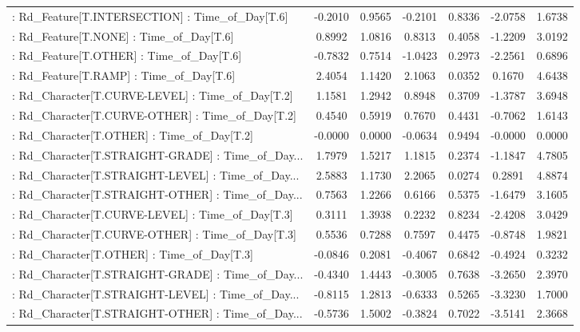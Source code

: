 \begin{longtable}{p{4cm}cccccc}
 : Rd\_Feature[T.INTERSECTION] : Time\_of\_Day[T.6]   & -0.2010 &    0.9565 & -0.2101 &       0.8336 & -2.0758 &  1.6738 \\
 : Rd\_Feature[T.NONE] : Time\_of\_Day[T.6]           &  0.8992 &    1.0816 &  0.8313 &       0.4058 & -1.2209 &  3.0192 \\
 : Rd\_Feature[T.OTHER] : Time\_of\_Day[T.6]          & -0.7832 &    0.7514 & -1.0423 &       0.2973 & -2.2561 &  0.6896 \\
 : Rd\_Feature[T.RAMP] : Time\_of\_Day[T.6]           &  2.4054 &    1.1420 &  2.1063 &       0.0352 &  0.1670 &  4.6438 \\
 : Rd\_Character[T.CURVE-LEVEL] : Time\_of\_Day[T.2]  &  1.1581 &    1.2942 &  0.8948 &       0.3709 & -1.3787 &  3.6948 \\
 : Rd\_Character[T.CURVE-OTHER] : Time\_of\_Day[T.2]  &  0.4540 &    0.5919 &  0.7670 &       0.4431 & -0.7062 &  1.6143 \\
 : Rd\_Character[T.OTHER] : Time\_of\_Day[T.2]        & -0.0000 &    0.0000 & -0.0634 &       0.9494 & -0.0000 &  0.0000 \\
 : Rd\_Character[T.STRAIGHT-GRADE] : Time\_of\_Day... &  1.7979 &    1.5217 &  1.1815 &       0.2374 & -1.1847 &  4.7805 \\
 : Rd\_Character[T.STRAIGHT-LEVEL] : Time\_of\_Day... &  2.5883 &    1.1730 &  2.2065 &       0.0274 &  0.2891 &  4.8874 \\
 : Rd\_Character[T.STRAIGHT-OTHER] : Time\_of\_Day... &  0.7563 &    1.2266 &  0.6166 &       0.5375 & -1.6479 &  3.1605 \\
 : Rd\_Character[T.CURVE-LEVEL] : Time\_of\_Day[T.3]  &  0.3111 &    1.3938 &  0.2232 &       0.8234 & -2.4208 &  3.0429 \\
 : Rd\_Character[T.CURVE-OTHER] : Time\_of\_Day[T.3]  &  0.5536 &    0.7288 &  0.7597 &       0.4475 & -0.8748 &  1.9821 \\
 : Rd\_Character[T.OTHER] : Time\_of\_Day[T.3]        & -0.0846 &    0.2081 & -0.4067 &       0.6842 & -0.4924 &  0.3232 \\
 : Rd\_Character[T.STRAIGHT-GRADE] : Time\_of\_Day... & -0.4340 &    1.4443 & -0.3005 &       0.7638 & -3.2650 &  2.3970 \\
 : Rd\_Character[T.STRAIGHT-LEVEL] : Time\_of\_Day... & -0.8115 &    1.2813 & -0.6333 &       0.5265 & -3.3230 &  1.7000 \\
 : Rd\_Character[T.STRAIGHT-OTHER] : Time\_of\_Day... & -0.5736 &    1.5002 & -0.3824 &       0.7022 & -3.5141 &  2.3668 \\

\end{longtable}
